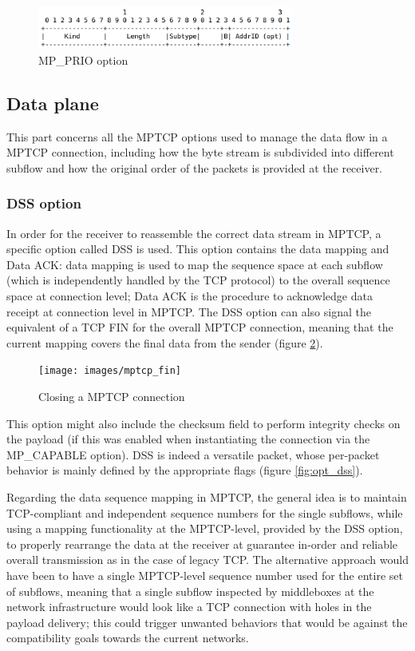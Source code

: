 \begin{figure}[!htb]
\centering
\includegraphics[width=0.75\textwidth]{images/opt_prio}
\caption{MP\_PRIO option}
\label{fig:opt_prio}
\end{figure}

\subsection{Data plane}
This part concerns all the MPTCP options used to manage the data flow in a MPTCP connection, including how the byte stream is subdivided into different subflow and how the original order of the packets is provided at the receiver.

\subsubsection{DSS option}
In order for the receiver to reassemble the correct data stream in MPTCP, a specific option called DSS is used. This option contains the data mapping and Data ACK: data mapping is used to map the sequence space at each subflow (which is independently handled by the TCP protocol) to the overall sequence space at connection level; Data ACK is the procedure to acknowledge data receipt at connection level in MPTCP.
The DSS option can also signal the equivalent of a TCP FIN for the overall MPTCP connection, meaning that the current mapping covers the final data from the sender (figure \ref{fig:mptcp_fin}). 

\begin{figure}[!htb]
\centering
\texttt{[image: images/mptcp\_fin]}
\caption{Closing a MPTCP connection}
\label{fig:mptcp_fin}
\end{figure}

This option might also include the checksum field to perform integrity checks on the payload (if this was enabled when instantiating the connection via the MP\_CAPABLE option).
DSS is indeed a versatile packet, whose per-packet behavior is mainly defined by the appropriate flags (figure \ref{fig:opt_dss}). 

Regarding the data sequence mapping in MPTCP, the general idea is to maintain TCP-compliant and independent sequence numbers for the single subflows, while using a mapping functionality at the MPTCP-level, provided by the DSS option, to properly rearrange the data at the receiver at guarantee in-order and reliable overall transmission as in the case of legacy TCP. The alternative approach would have been to have a single MPTCP-level sequence number used for the entire set of subflows, meaning that a single subflow inspected by middleboxes at the network infrastructure would look like a TCP connection with holes in the payload delivery; this could trigger unwanted behaviors that would be against the compatibility goals towards the current networks.


